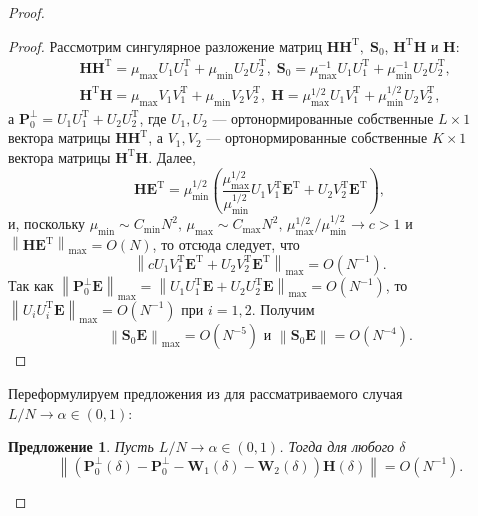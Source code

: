 \documentclass[specialist,
               substylefile = spbu_report.rtx,
               subf,href,colorlinks=true, 12pt]{disser}
\newcommand\norm[1]{\left\|#1\right\|}
\newtheorem{sentence}{Предложение}
\begin{document}
\begin{proof}
\begin{proof}
	Рассмотрим сингулярное разложение матриц $\mathbf{HH}^\mathrm{T},\;\mathbf{S}_0$, $\mathbf{H}^\mathrm{T}\mathbf{H}$ и $\mathbf{H}$:
	\begin{align*}
		&\mathbf{HH}^\mathrm{T} = \mu_{\max}U_1U_1^\mathrm{T}+\mu_{\min}U_2U_2^\mathrm{T},\; \mathbf{S}_0=\mu_{\max}^{-1}U_1U_1^\mathrm{T}+\mu_{\min}^{-1}U_2U_2^\mathrm{T},\\
		&\mathbf{H}^\mathrm{T}\mathbf{H}=\mu_{\max}V_1V_1^\mathrm{T}+\mu_{\min}V_2V_2^\mathrm{T},\;\mathbf{H}=\mu_{\max}^{1/2}U_1V_1^\mathrm{T}+\mu_{\min}^{1/2}U_2V_2^\mathrm{T},
	\end{align*}
	а $\mathbf{P}_0^\bot = U_1U_1^\mathrm{T} + U_2U_2^\mathrm{T}$, где $U_1,U_2$ --- ортонормированные собственные $L\times 1$ вектора матрицы $\mathbf{HH}^\mathrm{T}$, а $V_1, V_2$ --- ортонормированные собственные $K\times 1$ вектора матрицы $\mathbf{H}^\mathrm{T}\mathbf{H}$. Далее,
	\begin{equation*}
		\mathbf{HE}^\mathrm{T} = \mu_{\min}^{1/2}\left(\dfrac{\mu_{\max}^{1/2}}{\mu_{\min}^{1/2}}U_1V_1^\mathrm{T}\mathbf{E}^\mathrm{T}+U_2V_2^\mathrm{T}\mathbf{E}^\mathrm{T}\right),
	\end{equation*}
	и, поскольку $\mu_{\min}\sim C_{\min}N^2,\,\mu_{\max}\sim C_{\max}N^2,\,\mu_{\max}^{1/2}/\mu_{\min}^{1/2}\rightarrow c>1$ и $\norm{\mathbf{HE}^\mathrm{T}}_{\max}=O(N)$, то отсюда следует, что
	\begin{equation*}
		\norm{cU_1V_1^\mathrm{T}\mathbf{E}^\mathrm{T}+U_2V_2^\mathrm{T}\mathbf{E}^\mathrm{T}}_{\max}=O(N^{-1}).
	\end{equation*}
	Так как $\norm{\mathbf{P}_0^\bot\mathbf{E}}_{\max}=\norm{U_1U_1^\mathrm{T}\mathbf{E}+U_2U_2^\mathrm{T}\mathbf{E}}_{\max}=O(N^{-1})$, то $\norm{U_iU_i^\mathrm{T}\mathbf{E}}_{\max}=O(N^{-1})$ при $i=1,2$. Получим
	\begin{equation*}
		\norm{\mathbf{S}_0\mathbf{E}}_{\max}=O(N^{-5}) \textrm{ и } \norm{\mathbf{S}_0\mathbf{E}}=O(N^{-4}).
	\end{equation*} 
\end{proof}
Переформулируем предложения из \cite{ZNekrutkin} для рассматриваемого случая $L/N\rightarrow\alpha\in(0,1)$:
\begin{sentence}
	Пусть $L/N\rightarrow\alpha\in(0,1)$. Тогда для любого $\delta$
	\begin{equation*}
		\norm{\left(\mathbf{P}_0^\bot(\delta) - \mathbf{P}_0^\bot - \mathbf{W}_1(\delta) - \mathbf{W}_2(\delta)\right)\mathbf{H}(\delta)} = O(N^{-1}).
	\end{equation*}
\end{sentence}


\end{proof}
\end{document}
